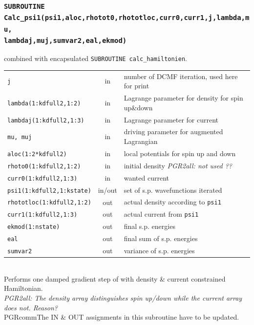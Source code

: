\documentclass[final,1p]{elsarticle}
\newcommand{\PGRcomm}[1]{{\color{blue}\small\em PGR2all: #1}}
\begin{document}
\subsubsection*{\tt SUBROUTINE
  Calc\_psi1(psi1,aloc,rhotot0,rhototloc,curr0,curr1,j,lambda,mu,
\\
lambdaj,muj,sumvar2,eal,ekmod)}
\noindent
combined with encapsulated {\tt SUBROUTINE calc\_hamiltonien}.
\\
\begin{tabular}{lcl}
 {\tt j} & in & number of DCMF iteration, used here for print\\
 {\tt lambda(1:kdfull2,1:2)} & in & Lagrange parameter for density for
 spin up\&down\\
 {\tt lambdaj(1:kdfull2,1:3)} & in & Lagrange parameter for current\\
 {\tt mu, muj} & in & driving parameter for augmented Lagrangian\\
 {\tt aloc(1:2*kdfull2)} & in & local potentials for spin up and down\\
 {\tt rhoto0(1:kdfull2,1:2)} & in & initial density \PGRcomm{not used ??}\\
 {\tt curr0(1:kdfull2,1:3)} & in & wanted current \\
 {\tt psi1(1:kdfull2,1:kstate)} & in/out & set of s.p. wavefunctions iterated\\
 {\tt rhototloc(1:kdfull2,1:2)} & out & actual density according to {\tt psi1}\\
 {\tt curr1(1:kdfull2,1:3)} & out & actual current from {\tt psi1}\\
 {\tt ekmod(1:nstate)} & out & final s.p. energies\\
 {\tt eal} & out & final sum of s.p. energies\\
 {\tt sumvar2} & out & variance of s.p. energies\\
\end{tabular}
\\[4pt]
Performs one damped gradient step of with density \& current
constrained Hamiltonian.
\\
\PGRcomm{The density array distinguishes spin up/down while the
  current array does not. Reason?}
\\
PGRcomm{The IN \& OUT assignments in this subroutine have to be updated.}
\end{document}
